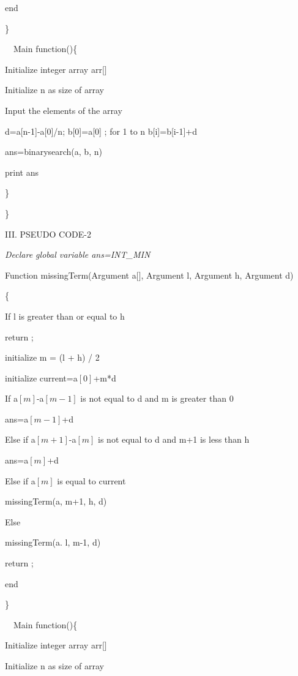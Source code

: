 \documentclass[12pt,a4paper]{article}
\begin{document}
\begin{multicols}{2}
end

\} 

\ \ Main function()\{ 

\quad Initialize integer array arr$[$$]$

\quad  Initialize n as size of array

\quad Input the elements of the array 

\quad d=a[n-1]-a[0]/n;
\quad b[0]=a[0] ; 
\quad for 1 to n b[i]=b[i-1]+d

\quad ans=binarysearch(a, b, n)

\quad print ans

\}



\} 


\begin{center}III. PSEUDO CODE-2\end{center}

\textit{ Declare global variable ans=INT\_MIN}

Function missingTerm(Argument a$[$$]$, Argument l, Argument h, Argument d) 


\{ 

\quad  If l is greater than or equal to h 

\quad\quad return ; 



\quad initialize m = (l + h) / 2

\quad initialize current=a$[0]$+m*d



\quad If a$[m]$-a$[m-1]$ is not equal to d and m is greater than 0

\quad\quad ans=a$[m-1]$+d 


\quad Else if a$[m+1]$-a$[m]$ is not equal to d and m+1 is less than h 

 \quad\quad ans=a$[m]$+d 
 
 \quad Else if a$[m]$ is equal to current
 
 \quad\quad missingTerm(a, m+1, h, d)
 
 \quad Else 
 
 \quad\quad missingTerm(a. l, m-1, d)

 

\quad return ; 

end

\} 

\ \ Main function()\{ 

\quad Initialize integer array arr$[$$]$

\quad  Initialize n as size of array


\end{multicols}
\end{document}
